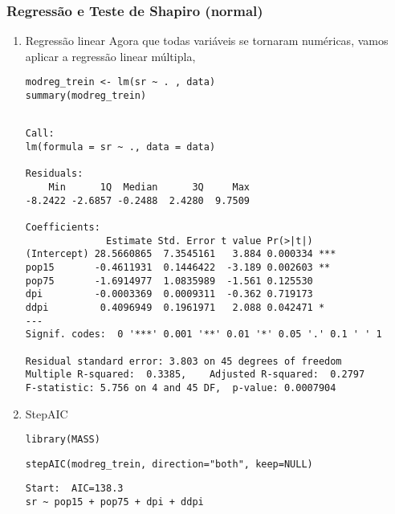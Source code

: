 \documentclass[11pt]{article}
\begin{document}
\subsubsection{Regressão e Teste de Shapiro (normal)}
\label{sec:orgf0e8f8d}
\begin{enumerate}
\item Regressão linear
\label{sec:org449b4c2}
Agora que todas variáveis se tornaram numéricas, vamos aplicar a regressão linear múltipla,

\begin{verbatim}
modreg_trein <- lm(sr ~ . , data)
summary(modreg_trein)
\end{verbatim}

\begin{verbatim}

Call:
lm(formula = sr ~ ., data = data)

Residuals:
    Min      1Q  Median      3Q     Max 
-8.2422 -2.6857 -0.2488  2.4280  9.7509 

Coefficients:
              Estimate Std. Error t value Pr(>|t|)    
(Intercept) 28.5660865  7.3545161   3.884 0.000334 ***
pop15       -0.4611931  0.1446422  -3.189 0.002603 ** 
pop75       -1.6914977  1.0835989  -1.561 0.125530    
dpi         -0.0003369  0.0009311  -0.362 0.719173    
ddpi         0.4096949  0.1961971   2.088 0.042471 *  
---
Signif. codes:  0 '***' 0.001 '**' 0.01 '*' 0.05 '.' 0.1 ' ' 1

Residual standard error: 3.803 on 45 degrees of freedom
Multiple R-squared:  0.3385,	Adjusted R-squared:  0.2797 
F-statistic: 5.756 on 4 and 45 DF,  p-value: 0.0007904

\end{verbatim}

\item StepAIC
\label{sec:orgd85a8e9}
\begin{verbatim}
library(MASS)
\end{verbatim}

\begin{verbatim}
stepAIC(modreg_trein, direction="both", keep=NULL)
\end{verbatim}

\begin{verbatim}
Start:  AIC=138.3
sr ~ pop15 + pop75 + dpi + ddpi


\end{verbatim}
\end{enumerate}
\end{document}

